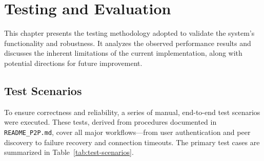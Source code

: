\section{Testing and Evaluation}

This chapter presents the testing methodology adopted to validate the system’s functionality and robustness. 
It analyzes the observed performance results and discusses the inherent limitations of the current implementation, 
along with potential directions for future improvement.

\subsection{Test Scenarios}

To ensure correctness and reliability, a series of manual, end-to-end test scenarios were executed. 
These tests, derived from procedures documented in \texttt{README\_P2P.md}, cover all major workflows—from user authentication and peer discovery to failure recovery and connection timeouts. 
The primary test cases are summarized in Table~\ref{tab:test-scenarios}.

